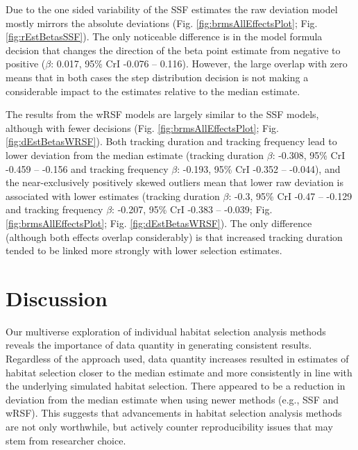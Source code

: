 \documentclass[10pt,a4paper]{article}
\begin{document}
Due to the one sided variability of the SSF estimates the raw deviation model mostly mirrors the absolute deviations (Fig. \ref{fig:brmsAllEffectsPlot}; Fig. \ref{fig:rEstBetasSSF}).
The only noticeable difference is in the model formula decision that changes the direction of the beta point estimate from negative to positive (\(\beta\): 0.017, 95\% CrI -0.076 -- 0.116).
However, the large overlap with zero means that in both cases the step distribution decision is not making a considerable impact to the estimates relative to the median estimate.

The results from the wRSF models are largely similar to the SSF models, although with fewer decisions (Fig. \ref{fig:brmsAllEffectsPlot}; Fig. \ref{fig:dEstBetasWRSF}).
Both tracking duration and tracking frequency lead to lower deviation from the median estimate (tracking duration \(\beta\): -0.308, 95\% CrI -0.459 -- -0.156 and tracking frequency \(\beta\): -0.193, 95\% CrI -0.352 -- -0.044), and the near-exclusively positively skewed outliers mean that lower raw deviation is associated with lower estimates (tracking duration \(\beta\): -0.3, 95\% CrI -0.47 -- -0.129 and tracking frequency \(\beta\): -0.207, 95\% CrI -0.383 -- -0.039; Fig. \ref{fig:brmsAllEffectsPlot}; Fig. \ref{fig:dEstBetasWRSF}).
The only difference (although both effects overlap considerably) is that increased tracking duration tended to be linked more strongly with lower selection estimates.

\section{Discussion}\label{discussion}

Our multiverse exploration of individual habitat selection analysis methods reveals the importance of data quantity in generating consistent results.
Regardless of the approach used, data quantity increases resulted in estimates of habitat selection closer to the median estimate and more consistently in line with the underlying simulated habitat selection.
There appeared to be a reduction in deviation from the median estimate when using newer methods (e.g., SSF and wRSF).
This suggests that advancements in habitat selection analysis methods are not only worthwhile, but actively counter reproducibility issues that may stem from researcher choice.
\end{document}
